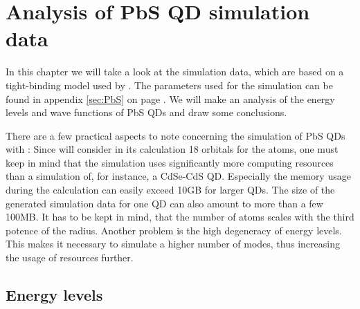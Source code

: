\chapter{Analysis of PbS QD simulation data}

In this chapter we will take a look at the simulation data, which are based on a tight-binding model used by \omen. The parameters used for the simulation can be found in appendix \ref{sec:PbS} on page \pageref{sec:PbS}. We will make an analysis of the energy levels and wave functions of PbS QDs and draw some conclusions.\\

\begin{REMARK} 
There are a few practical aspects to note concerning the simulation of PbS QDs with \omen: Since \omen will consider in its calculation 18 orbitals for the atoms, one must keep in mind that the simulation uses significantly more computing resources than a simulation of, for instance, a CdSe-CdS QD. Especially the memory usage during the calculation can easily exceed 10GB for larger QDs. The size of the generated simulation data for one QD can also amount to more than a few 100MB. It has to be kept in mind, that the number of atoms scales with the third potence of the radius. Another problem is the high degeneracy of energy levels. This makes it necessary to simulate a higher number of modes, thus increasing the usage of resources further.
\end{REMARK}

\section{Energy levels}

